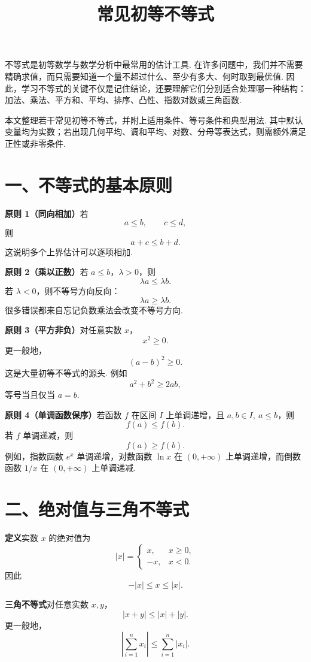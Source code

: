 \documentclass[UTF8, 12pt, fontset=fandol, oneside]{ctexart}
\title{常见初等不等式}
\author{}
\date{}
\begin{document}
\maketitle

不等式是初等数学与数学分析中最常用的估计工具. 在许多问题中，我们并不需要精确求值，而只需要知道一个量不超过什么、至少有多大、何时取到最优值. 因此，学习不等式的关键不仅是记住结论，还要理解它们分别适合处理哪一种结构：加法、乘法、平方和、平均、排序、凸性、指数对数或三角函数.

本文整理若干常见初等不等式，并附上适用条件、等号条件和典型用法. 其中默认变量均为实数；若出现几何平均、调和平均、对数、分母等表达式，则需额外满足正性或非零条件.

\section*{一、不等式的基本原则}

\noindent\textbf{原则 1（同向相加）}\quad 若
\[
  a\le b,\qquad c\le d,
\]
则
\[
  a+c\le b+d.
\]
这说明多个上界估计可以逐项相加.

\noindent\textbf{原则 2（乘以正数）}\quad 若 $a\le b$，$\lambda>0$，则
\[
  \lambda a\le \lambda b.
\]
若 $\lambda<0$，则不等号方向反向：
\[
  \lambda a\ge \lambda b.
\]
很多错误都来自忘记负数乘法会改变不等号方向.

\noindent\textbf{原则 3（平方非负）}\quad 对任意实数 $x$，
\[
  x^2\ge0.
\]
更一般地，
\[
  (a-b)^2\ge0.
\]
这是大量初等不等式的源头. 例如
\[
  a^2+b^2\ge2ab,
\]
等号当且仅当 $a=b$.

\noindent\textbf{原则 4（单调函数保序）}\quad 若函数 $f$ 在区间 $I$ 上单调递增，且 $a,b\in I,\ a\le b$，则
\[
  f(a)\le f(b).
\]
若 $f$ 单调递减，则
\[
  f(a)\ge f(b).
\]
例如，指数函数 $e^x$ 单调递增，对数函数 $\ln x$ 在 $(0,+\infty)$ 上单调递增，而倒数函数 $1/x$ 在 $(0,+\infty)$ 上单调递减.

\section*{二、绝对值与三角不等式}

\noindent\textbf{定义}\quad 实数 $x$ 的绝对值为
\[
  |x|=
  \begin{cases}
    x, & x\ge0,\\
    -x, & x<0.
  \end{cases}
\]
因此
\[
  -|x|\le x\le |x|.
\]

\noindent\textbf{三角不等式}\quad 对任意实数 $x,y$，
\[
  |x+y|\le |x|+|y|.
\]
更一般地，
\[
  \left|\sum_{i=1}^n x_i\right|
  \le
  \sum_{i=1}^n |x_i|.
\]
\end{document}
